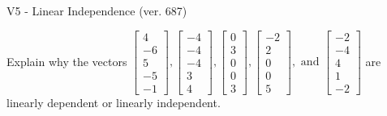 \begin{exercise}
  \begin{exerciseTitle}V5 - Linear Independence (ver. 687)\end{exerciseTitle}
  \begin{exerciseStatement}
    Explain why the vectors \(\left[\begin{array}{r}
4 \\
-6 \\
5 \\
-5 \\
-1
\end{array}\right] , \left[\begin{array}{r}
-4 \\
-4 \\
-4 \\
3 \\
4
\end{array}\right] , \left[\begin{array}{r}
0 \\
3 \\
0 \\
0 \\
3
\end{array}\right] , \left[\begin{array}{r}
-2 \\
2 \\
0 \\
0 \\
5
\end{array}\right] , \text{ and } \left[\begin{array}{r}
-2 \\
-4 \\
4 \\
1 \\
-2
\end{array}\right]\) are linearly dependent or linearly independent.	



\end{exerciseStatement}
\end{exercise}
